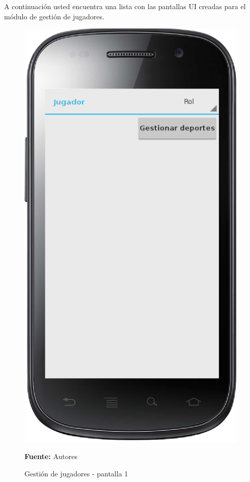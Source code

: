 A continuación usted encuentra una lista con las pantallas UI creadas para el módulo de gestión de jugadores.

\begin{figure}[!htb]
  \begin{center}
    \includegraphics[width=11cm]{./imagenes/UI/Jugador/gestion_jugador_1.png}
    \caption{Gestión de jugadores - pantalla 1}
    \label{fig:gestion_jugador_1}
    \textbf{Fuente:}  Autores
  \end{center}
\end{figure}


